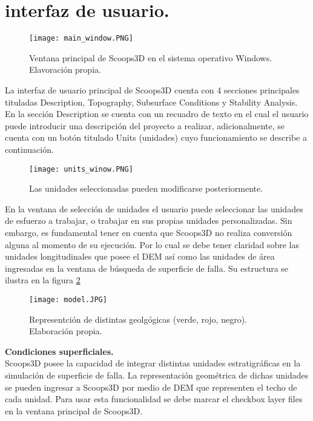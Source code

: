 \section{interfaz de usuario.}

\begin{figure}[h]
\centering
\texttt{[image: main\_window.PNG]}
\caption{Ventana principal de Scoops3D en el sistema operativo Windows. Elavoraci\'on propia.}
\label{fig:Interfaz de usuario}
\end{figure}

La interfaz de usuario principal de Scoops3D  cuenta con 4 secciones principales tituladas Description, Topography, Subsurface Conditions y Stability Analysis. En la secci\'{o}n Description se cuenta con un recuadro de texto en el cual el usuario puede introducir una descripci\'{o}n del proyecto a realizar, adicionalmente, se cuenta con un bot\'{o}n titulado Units (unidades) cuyo funcionamiento se describe a continuaci\'{o}n. \\

\begin{figure}[H]
\centering
\texttt{[image: units\_winow.PNG]}
\caption{Las unidades seleccionadas pueden modificarse posteriormente.}
\label{unidades}
\end{figure}


En la ventana de selecci\'{o}n de unidades el usuario puede seleccionar las unidades de
esfuerzo a trabajar, o trabajar en sus propias unidades personalizadas. Sin embargo, es
fundamental tener en cuenta que Scoops3D no realiza conversi\'{o}n alguna al momento de su
ejecuci\'{o}n. Por lo cual se debe tener claridad sobre las unidades longitudinales que posee el
DEM as\'{i} como las unidades de \'{a}rea ingresadas en la ventana de b\'{u}squeda de superficie de
falla. Su estructura se ilustra en la figura \ref{unidades}
\\
\begin{figure}[h]
\centering
\texttt{[image: model.JPG]}
\caption{Representci\'on de distintas geolg\'ogicas (verde, rojo, negro). Elaboraci\'on propia.}
\label{geo-units}
\end{figure}


\textbf{Condiciones superficiales.}\\
Scoops3D posee la capacidad de integrar distintas unidades estratigr\'{a}ficas en la simulaci\'{o}n
de superficie de falla. La representaci\'{o}n geom\'{e}trica de dichas unidades se pueden ingresar
a Scoops3D por medio de DEM que representen el techo de cada unidad.
Para usar esta funcionalidad se debe marcar el checkbox layer files en la ventana principal
de Scoops3D.
\\

